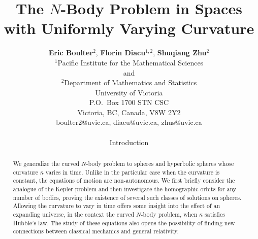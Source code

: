 \documentclass[12pt]{amsart}
\title{The $N$-Body Problem in Spaces with Uniformly Varying Curvature}
\theoremstyle{definition}
\begin{document}
\maketitle
{}
\author{\begin{center}
{\bf Eric Boulter}$^2$, {\bf Florin Diacu}$^{1,2}$, {\bf Shuqiang Zhu$^2$}\\
\bigskip
{\footnotesize $^1$Pacific Institute for the Mathematical Sciences\\
and\\
$^2$Department of Mathematics and Statistics\\
University of Victoria\\
P.O.~Box 1700 STN CSC\\
Victoria, BC, Canada, V8W 2Y2\\
\bigskip
boulter2@uvic.ca, diacu@uvic.ca, zhus@uvic.ca\\
}
\end{center}


\begin{abstract}
We generalize the curved $N$-body problem to spheres and hyperbolic spheres whose curvature $\kappa$ varies in time.
Unlike in the particular case when the curvature is constant, the equations of motion are non-autonomous. We first briefly consider the analogue of the Kepler problem and then investigate the homographic orbits for any number of bodies, proving the existence of several such classes of solutions on spheres. Allowing the curvature to vary in time offers some insight into the effect of an expanding universe, in the context the curved $N$-body problem, when $\kappa$ satisfies Hubble's law. The study of these equations also opens the possibility of finding new connections between classical mechanics and general relativity.
\end{abstract}




{
\tableofcontents

}





\section{Introduction}

}
\end{document}
